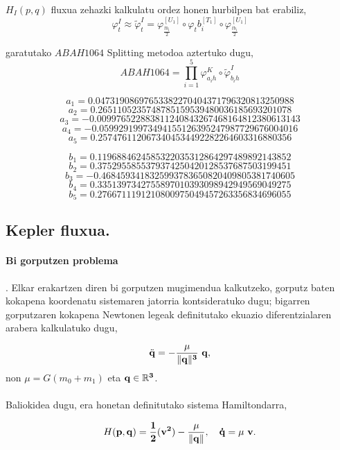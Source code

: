 \begin{enumerate}
$H_I(p,q)$ fluxua zehazki kalkulatu ordez honen hurbilpen bat erabiliz,
\begin{equation*}
\varphi_t^I \approx \tilde{\varphi}_t^I= \varphi_{\frac{tb_i}{2}}^{[U_1]} \circ \varphi_tb_i^{[T_1]} \circ \varphi_{\frac{tb_i}{2}}^{[U_1]}
\end{equation*}

garatutako $ABAH1064$ Splitting metodoa aztertuko dugu,
\[ABAH1064=\prod\limits_{i=1}^{5} \varphi_{a_ih}^K \circ \tilde{\varphi}_{b_ih}^I\]

\[a_1=0.04731908697653382270404371796320813250988\]
\[a_2=0.2651105235748785159539480036185693201078\]
\[a_3=-0.009976522883811240843267468164812380613143\]
\[a_4=-0.05992919973494155126395247987729676004016\]
\[a_5=0.2574761120673404534492282264603316880356\]

\[b_1=0.1196884624585322035312864297489892143852\]
\[b_2=0.3752955855379374250420128537687503199451\]
\[b_3=-0.4684593418325993783650820409805381740605\]
\[b_4=0.3351397342755897010393098942949569049275\]
\[b_5=0.2766711191210800975049457263356834696055\]


\end{enumerate} 


\subsection{Kepler fluxua.}

\paragraph*{\textbf{Bi gorputzen problema}}.
Elkar erakartzen diren bi gorputzen mugimendua kalkutzeko, gorputz baten kokapena koordenatu sistemaren jatorria kontsideratuko dugu; bigarren gorputzaren kokapena Newtonen legeak definitutako ekuazio diferentzialaren arabera kalkulatuko dugu,

\begin{equation}
\ddot{\bf{q}}= - \frac{\mu}{\|\bf{q}\|^3} \ \bf{q},
\end{equation}
non $\mu= G(m_0+m_1)$ eta  $\bf{q}\in \mathbb{R}^3$.


\paragraph{} Baliokidea dugu, era honetan definitutako sistema Hamiltondarra,

\begin{equation}
H(\bf{p},\bf{q})=\frac{1}{2}(\bf{v}^2)-\frac{\mu}{\|\bf{q}\|}, \ \ \  \bf{\dot{q}}=\mu \ \bf{v}.
\end{equation}

